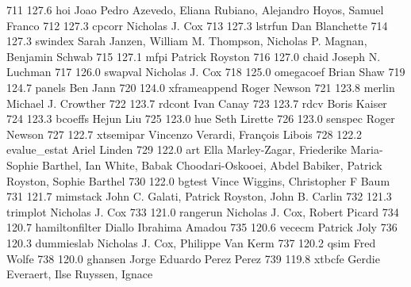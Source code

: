    711    127.6    hoi           Joao Pedro Azevedo, Eliana Rubiano,     
                                   Alejandro Hoyos, Samuel Franco          
   712    127.3    cpcorr        Nicholas J. Cox                         
   713    127.3    lstrfun       Dan Blanchette                          
   714    127.3    swindex       Sarah Janzen, William M. Thompson,      
                                   Nicholas P. Magnan, Benjamin Schwab     
   715    127.1    mfpi          Patrick Royston                         
   716    127.0    chaid         Joseph N. Luchman                       
   717    126.0    swapval       Nicholas J. Cox                         
   718    125.0    omegacoef     Brian Shaw                              
   719    124.7    panels        Ben Jann                                
   720    124.0    xframeappend  Roger Newson                            
   721    123.8    merlin        Michael J. Crowther                     
   722    123.7    rdcont        Ivan Canay                              
   723    123.7    rdcv          Boris Kaiser                            
   724    123.3    bcoeffs       Hejun Liu                               
   725    123.0    hue           Seth Lirette                            
   726    123.0    senspec       Roger Newson                            
   727    122.7    xtsemipar     Vincenzo Verardi, François Libois      
   728    122.2    evalue_estat  Ariel Linden                            
   729    122.0    art           Ella Marley-Zagar, Friederike           
                                   Maria-Sophie Barthel, Ian White, Babak  
                                   Choodari-Oskooei, Abdel Babiker,        
                                   Patrick Royston, Sophie Barthel         
   730    122.0    bgtest        Vince Wiggins, Christopher F Baum       
   731    121.7    mimstack      John C. Galati, Patrick Royston, John   
                                   B. Carlin                               
   732    121.3    trimplot      Nicholas J. Cox                         
   733    121.0    rangerun      Nicholas J. Cox, Robert Picard          
   734    120.7    hamiltonfilter  Diallo Ibrahima Amadou                  
   735    120.6    vececm        Patrick Joly                            
   736    120.3    dummieslab    Nicholas J. Cox, Philippe Van Kerm      
   737    120.2    qsim          Fred Wolfe                              
   738    120.0    ghansen       Jorge Eduardo Perez Perez               
   739    119.8    xtbcfe        Gerdie Everaert, Ilse Ruyssen, Ignace   
